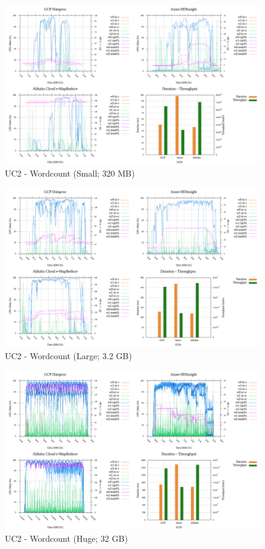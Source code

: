 \documentclass[review]{elsarticle}
\begin{document}
\begin{figure}[p]
	\caption{UC2 - Wordcount (Small; 320 MB)}
	\label{fig:uc2-wrdcnt-s-cmidt}
	\includegraphics[width=\textwidth]{uc2-wrdcnt-s-cmidt}
	\centering
\end{figure}

\begin{figure}[p]
	\caption{UC2 - Wordcount (Large; 3.2 GB)}
	\label{fig:uc2-wrdcnt-l-cmidt}
	\includegraphics[width=\textwidth]{uc2-wrdcnt-l-cmidt}
	\centering
\end{figure}

\begin{figure}[p]
	\caption{UC2 - Wordcount (Huge; 32 GB)}
	\label{fig:uc2-wrdcnt-h-cmidt}
	\includegraphics[width=\textwidth]{uc2-wrdcnt-h-cmidt}
	\centering
\end{figure}
\end{document}
